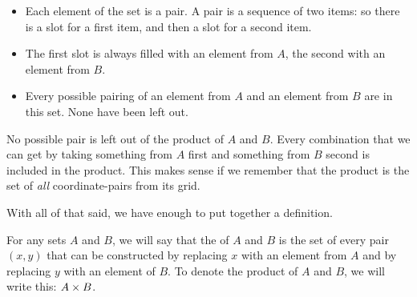\documentclass[../../../main.tex]{subfiles}
\begin{document}
\begin{itemize}
  \item Each element of the set is a pair. A pair is a sequence of two items: so there is a slot for a first item, and then a slot for a second item.
  \item The first slot is always filled with an element from $A$, the second with an element from $B$.
  \item Every possible pairing of an element from $A$ and an element from $B$ are in this set. None have been left out.
\end{itemize}

\begin{aside}
  \begin{remark}
    No possible pair is left out of the product of $A$ and $B$. Every combination that we can get by taking something from $A$ first and something from $B$ second is included in the product. This makes sense if we remember that the product is the set of \emph{all} coordinate-pairs from its grid.
  \end{remark}
\end{aside}

With all of that said, we have enough to put together a definition.

\begin{fdefinition}[Products]
  For any sets $A$ and $B$, we will say that the  of $A$ and $B$ is the set of every pair $(x, y)$ that can be constructed by replacing $x$ with an element from $A$ and by replacing $y$ with an element of $B$. To denote the product of $A$ and $B$, we will write this: $A \times B$.
\end{fdefinition}
\end{document}
